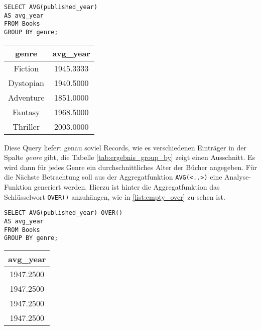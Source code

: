 \begin{minipage}{0.55\textwidth}
	 \begin{lstlisting}
SELECT AVG(published_year)
AS avg_year
FROM Books
GROUP BY genre;
	\end{lstlisting}
\end{minipage}
\hfill
\begin{minipage}{0.45\textwidth}
	\centering
	\begin{tabular}{|c|c|}
		\hline
		\textbf{genre} & \textbf{avg\_year} \\
		\hline
		Fiction        & 1945.3333          \\
		\hline
		Dystopian      & 1940.5000          \\
		\hline
		Adventure      & 1851.0000          \\
		\hline
		Fantasy        & 1968.5000          \\
		\hline
		Thriller       & 2003.0000          \\
		\hline
	\end{tabular}
	 \label{tab:ergebnis_group_by}
\end{minipage}

Diese Query liefert genau soviel Records, wie es verschiedenen Einträger in der
Spalte \textit{genre} gibt, die Tabelle \ref{tab:ergebnis_group_by} zeigt einen
Ausschnitt. Es wird dann für jedes Genre ein durchschnittliches Alter der Bücher
angegeben. Für die Nächste Betrachtung soll aus der Aggregatfunktion \texttt{AVG(<..>)}
eine Analyse-Funktion generiert werden. Hierzu ist hinter die Aggregatfunktion
das Schlüsselwort \texttt{OVER()} anzuhängen, wie in \ref{list:empty_over} zu
sehen ist.

\begin{minipage}{0.60\textwidth}
	 \begin{lstlisting}
SELECT AVG(published_year) OVER()
AS avg_year
FROM Books
GROUP BY genre;
	\end{lstlisting}
\end{minipage}
\hfill
\begin{minipage}{0.45\textwidth}
	\centering
	\begin{tabular}{|c|}
		\hline
		\textbf{avg\_year} \\
		\hline
		1947.2500          \\
		\hline
		1947.2500          \\
		\hline
		1947.2500          \\
		\hline
		1947.2500          \\
		\hline
	\end{tabular}
	 \label{tab:ergebnis_over}
\end{minipage}

